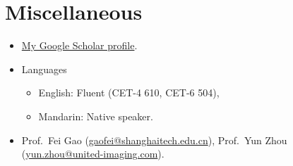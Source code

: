 \documentclass{resume}
\begin{document}
\section{Miscellaneous}
\begin{itemize}
  \item \href{https://scholar.google.com/citations?user=-TaP8h4AAAAJ&hl=zh-CN}{My Google Scholar profile}.
  \item Languages
  \begin{itemize}
    \item English: Fluent (CET-4 610, CET-6 504),
    \item Mandarin: Native speaker.
  \end{itemize}
  \item Prof.~Fei Gao (\url{gaofei@shanghaitech.edu.cn}), Prof.~Yun Zhou (\url{yun.zhou@united-imaging.com}).
\end{itemize}

%
%
\end{document}
